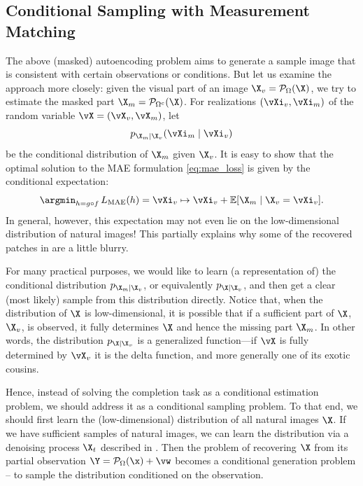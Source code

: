 \documentclass[../../book-main.tex]{subfiles}
\begin{document}
\subsection{Conditional Sampling with Measurement Matching}
\label{sec:conditioned-decoding}
The above (masked) autoencoding problem aims to generate a sample image that is consistent with certain observations or conditions. But let us examine the approach more closely: given the
visual part of an image $\X_v = \mathcal{P}_{\Omega}(\X)$, we try to
estimate the masked part $\X_m = \mathcal{P}_{\Omega^c}(\X)$. For realizations
$(\vXi_v, \vXi_m)$ of the random variable $\vX=(\vX_v, \vX_m)$, let
\[p_{\X_m \mid \X_v}(\vXi_m\mid \vXi_v)\]
be the conditional distribution of $\X_m$ given
$\X_v$. It is easy to show that the optimal solution to the  MAE
formulation \eqref{eq:mae_loss} is given by the conditional expectation:
\begin{equation}
  \argmin_{h = g \circ f}\, L_{\mathrm{MAE}}(h)
  = \vXi_v \mapsto \vXi_v + \mathbb{E}[\X_m \mid \X_v=\vXi_v].
\end{equation}
In general, however, this expectation may not even lie on the
low-dimensional distribution of natural images! This partially
explains why some of the recovered patches in 
are a little blurry.

For many practical purposes, we would like to learn (a representation
of) the conditional distribution $p_{\X_m \mid \X_v}$, or equivalently
$p_{\X \mid \X_v}$,
and then get a clear (most likely) sample from this distribution directly. Notice that, when the distribution of $\X$ is low-dimensional, it is possible that if a
sufficient part of $\X$, $\X_v$, is observed, it fully determines
$\X$ and hence the missing part $\X_m$. In other words, the distribution
$p_{\X \mid \X_v}$ is a generalized function---if $\vX$ is fully determined by $\vX_v$ it is the delta function, and more generally one of its exotic cousins.

Hence, instead of solving the completion task as a conditional estimation problem, we should address it as a conditional sampling problem. To that end, we should first learn the (low-dimensional) distribution of all natural images $\X$. If we have sufficient samples of natural images, we can learn the distribution via a denoising process $\X_t$ described in . Then the problem of recovering $\X$ from its partial observation $\Y = \mathcal{P}_\Omega(\x) +\vw$ becomes a conditional generation problem -- to sample the distribution conditioned on the observation.
\end{document}
